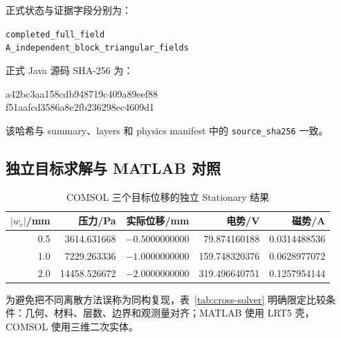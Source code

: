 \documentclass[UTF8,fontset=windows,12pt,a4paper]{ctexart}
\begin{document}
正式状态与证据字段分别为：

\begin{center}
\texttt{completed\_full\_field}\\[0.2em]
\texttt{A\_independent\_block\_triangular\_fields}
\end{center}

正式 Java 源码 SHA-256 为：

\begin{center}
\footnotesize\ttfamily
a42bc3aa158cdb948719c409a89eef88\\
f51aafcd3586a8e2fb236298ec4609d1
\end{center}

该哈希与 summary、layers 和 physics manifest 中的 \texttt{source\_sha256} 一致。

\subsection{独立目标求解与 MATLAB 对照}

\begin{table}[H]
\centering
\caption{COMSOL 三个目标位移的独立 Stationary 结果}
\label{tab:comsol-targets}
\small
\begin{tabular}{rrrrr}
\toprule
$|w_c|$/mm & 压力/Pa & 实际位移/mm & 电势/V & 磁势/A \\
\midrule
0.5 & 3614.631668 & $-0.5000000000$ & 79.874160188 & 0.0314488536 \\
1.0 & 7229.263336 & $-1.0000000000$ & 159.748320376 & 0.0628977072 \\
2.0 & 14458.526672 & $-2.0000000000$ & 319.496640751 & 0.1257954144 \\
\bottomrule
\end{tabular}
\end{table}

为避免把不同离散方法误称为同构复现，表~\ref{tab:cross-solver} 明确限定比较条件：几何、材料、层数、边界和观测量对齐；MATLAB 使用 LRT5 壳，COMSOL 使用三维二次实体。

\begin{table}[H]
\centering
\caption{$10\times10$ 面内划分下的非同构跨软件对照}
\label{tab:cross-solver}
\small
{}
\end{table}
\end{document}
